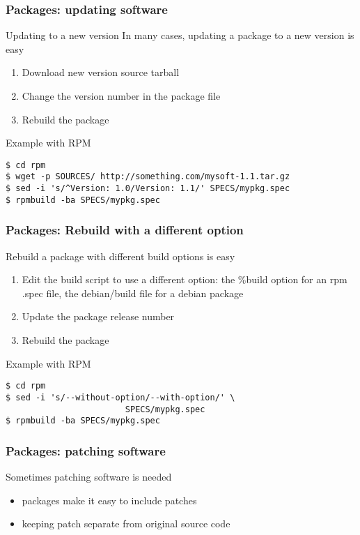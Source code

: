 \documentclass{beamer}
\begin{document}
\begin{frame}[fragile]
  \frametitle{Packages: updating software}
  \begin{block}{Updating to a new version}
    In many cases, updating a package to a new version is easy
    \begin{enumerate}
      \item Download new version source tarball
      \item Change the version number in the package file
      \item Rebuild the package
    \end{enumerate}
  \end{block}

  \begin{block}{Example with RPM}
\begin{verbatim}
$ cd rpm
$ wget -p SOURCES/ http://something.com/mysoft-1.1.tar.gz
$ sed -i 's/^Version: 1.0/Version: 1.1/' SPECS/mypkg.spec
$ rpmbuild -ba SPECS/mypkg.spec
\end{verbatim}
  \end{block}
\end{frame}

\begin{frame}[fragile]
  \frametitle{Packages: Rebuild with a different option}
  Rebuild a package with different build options is easy
  \begin{enumerate}
    \item Edit the build script to use a different option: the \%build
          option for an rpm .spec file, the debian/build file for a debian
          package
    \item Update the package release number
    \item Rebuild the package
  \end{enumerate}

  \begin{block}{Example with RPM}
\begin{verbatim}
$ cd rpm
$ sed -i 's/--without-option/--with-option/' \
                        SPECS/mypkg.spec
$ rpmbuild -ba SPECS/mypkg.spec
\end{verbatim}
  \end{block}
\end{frame}

\begin{frame}
  \frametitle{Packages: patching software}

  Sometimes patching software is needed

  \begin{itemize}
    \item packages make it easy to include patches
    \item keeping patch separate from original source code
  \end{itemize}
\end{frame}
\end{document}
